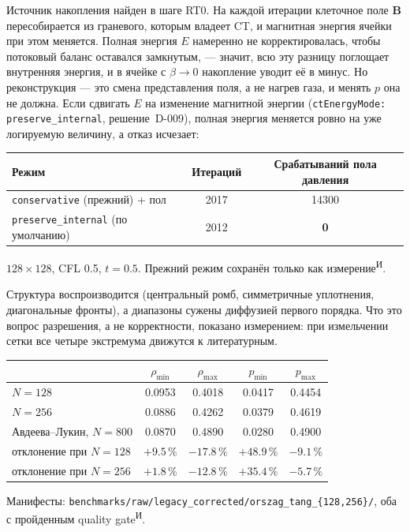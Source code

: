 \documentclass[12pt,a4paper]{article}
\newcommand{\B}{\mathbf{B}}
\newcommand{\code}[1]{\texttt{#1}}
\newcommand{\Iz}{\textsuperscript{\scriptsize И}}    %
\begin{document}
Источник накопления найден в шаге RT0. На каждой итерации клеточное поле $\B$
пересобирается из граневого, которым владеет CT, и магнитная энергия ячейки при
этом меняется. Полная энергия $E$ намеренно не корректировалась, чтобы потоковый
баланс оставался замкнутым, --- значит, всю эту разницу поглощает внутренняя
энергия, и в ячейке с $\beta\to0$ накопление уводит её в минус. Но
реконструкция --- это смена представления поля, а не нагрев газа, и менять $p$
она не должна. Если сдвигать $E$ на изменение магнитной энергии
(\code{ctEnergyMode: preserve\_internal}, решение~D-009), полная энергия меняется
ровно на уже логируемую величину, а отказ исчезает:

\begin{center}\footnotesize
\begin{tabular}{lcc}
\toprule
Режим & Итераций & Срабатываний пола давления \\
\midrule
\code{conservative} (прежний) + пол & 2017 & 14300 \\
\code{preserve\_internal} (по умолчанию) & 2012 & \textbf{0} \\
\bottomrule
\end{tabular}
\end{center}
\noindent\footnotesize
$128\times128$, CFL 0.5, $t=0.5$. Прежний режим сохранён только как измерение\Iz.\normalsize

\medskip
Структура воспроизводится (центральный ромб, симметричные уплотнения,
диагональные фронты), а диапазоны сужены диффузией первого порядка. Что это
вопрос разрешения, а не корректности, показано измерением: при
измельчении сетки все четыре экстремума движутся к литературным.

\begin{center}\footnotesize
\begin{tabular}{lcccc}
\toprule
& $\rho_{\min}$ & $\rho_{\max}$ & $p_{\min}$ & $p_{\max}$ \\
\midrule
$N=128$                       & 0.0953 & 0.4018 & 0.0417 & 0.4454 \\
$N=256$                       & 0.0886 & 0.4262 & 0.0379 & 0.4619 \\
Авдеева--Лукин, $N=800$       & 0.0870 & 0.4890 & 0.0280 & 0.4900 \\
\midrule
отклонение при $N=128$        & $+9.5\,\%$ & $-17.8\,\%$ & $+48.9\,\%$ & $-9.1\,\%$ \\
отклонение при $N=256$        & $\mathbf{+1.8\,\%}$ & $-12.8\,\%$ & $+35.4\,\%$ & $-5.7\,\%$ \\
\bottomrule
\end{tabular}
\end{center}
\noindent\footnotesize
Манифесты: \code{benchmarks/raw/legacy\_corrected/orszag\_tang\_\{128,256\}/},
оба с пройденным quality gate\Iz.\normalsize
\end{document}
